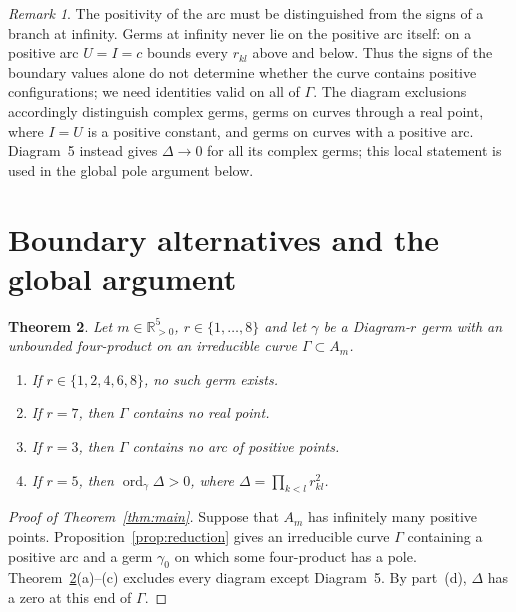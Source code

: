 \documentclass[11pt]{amsart}
\newenvironment{alphalist}{\begin{enumerate}\renewcommand{\labelenumi}{(\alph{enumi})}%
  \renewcommand{\theenumi}{\alph{enumi}}}{\end{enumerate}}
\newtheorem{theorem}{Theorem}[section]
\theoremstyle{definition}
\theoremstyle{remark}
\newtheorem{remark}[theorem]{Remark}
\newcommand{\Rp}{\mathbb{R}_{>0}}
\newcommand{\ord}{\operatorname{ord}}
\begin{document}
\begin{remark}\label{rem:levels}
The positivity of the arc must be distinguished from the signs of a branch at infinity.
Germs at infinity never lie on the positive arc itself: on a positive arc $U=I=c$ bounds every
$r_{kl}$ above and below.  Thus the signs of the boundary values alone do not determine whether the curve contains
positive configurations; we need identities valid on all of $\Gamma$.
{The diagram exclusions accordingly distinguish complex germs,
germs on curves through a real point, where $I=U$ is a positive constant, and germs on curves
with a positive arc.  Diagram~5 instead gives $\Delta\to0$ for all its complex germs;
this local statement is used in the global pole argument below.}
\end{remark}


{
\section{Boundary alternatives and the global argument}\label{sec:exclusion}

\begin{theorem}\label{thm:exclusion}
Let $m\in\Rp^5$, $r\in\{1,\dots,8\}$ and let $\gamma$ be a Diagram-$r$ germ with an unbounded
four-product on an irreducible curve $\Gamma\subset A_m$.
\begin{alphalist}
  \item If $r\in\{1,2,4,6,8\}$, no such germ exists.
  \item If $r=7$, then $\Gamma$ contains no real point.
  \item If $r=3$, then $\Gamma$ contains no arc of positive points.
  \item If $r=5$, then $\ord_\gamma\Delta>0$, where $\Delta=\prod_{k<l}r_{kl}^2$.
\end{alphalist}
\end{theorem}

\begin{proof}[Proof of Theorem~\ref{thm:main}]
Suppose that $A_m$ has infinitely many positive points.  Proposition~\ref{prop:reduction}
gives an irreducible curve $\Gamma$ containing a positive arc and a germ $\gamma_0$ on which
some four-product has a pole.  Theorem~\ref{thm:exclusion}(a)--(c) excludes every diagram
except Diagram~5.  By part~(d), $\Delta$ has a zero at this end of $\Gamma$.


\end{proof}}
\end{document}

